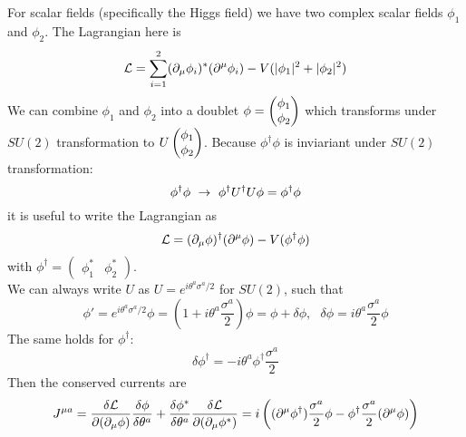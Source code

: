 For scalar fields (specifically the Higgs field) we have two complex scalar fields $\phi_1$ and $\phi_2$. The Lagrangian here is
\[ \mathcal{L} = \sum_{i = 1}^2 ( \partial _ \mu \phi_i)^*( \partial^\mu \phi_i) - V( | \phi_1|^2+ | \phi_2|^2)\]
We can combine $\phi_1$ and $\phi_2$ into a doublet $\phi = \begin{pmatrix} \phi_1 \\ \phi_2 \end{pmatrix}$ which transforms under $SU(2)$ transformation to $U \begin{pmatrix} \phi_1 \\ \phi_2 \end{pmatrix}$. Because $\phi^\dagger \phi$ is inviariant under $SU(2)$ transformation:
\[ \phi^\dagger \phi ~\rightarrow ~ \phi^\dagger U ^\dagger U \phi = \phi^\dagger \phi\]
it is useful to write the Lagrangian as
\[ \mathcal{L} = ( \partial_\mu \phi)^\dagger ( \partial^\mu \phi) - V( \phi^\dagger \phi)\]
with $ \phi^\dagger = \begin{pmatrix} \phi_1^* & \phi_2^*\end{pmatrix}$.\\
We can always write $U$ as $U = e^{i \theta^a \sigma^a/2}$ for $SU(2)$, such that 
\[ \phi' = e^{i \theta^a \sigma^a/2} \phi = \left( 1 + i \theta ^a \frac{\sigma^a}{2}\right) \phi = \phi + \delta \phi, ~~~\delta \phi = i \theta^a \frac{\sigma^a}{2} \phi\]
The same holds for $\phi^\dagger$:
\[ \delta \phi^\dagger = - i \theta^a \phi^\dagger \frac{\sigma^a}{2}\]
Then the conserved currents are
\[ J^{\mu a} = \frac{ \delta \mathcal{L}}{\partial ( \partial_\mu \phi)} \frac{\delta \phi}{\delta \theta^a} + \frac{\delta \phi^*}{\delta \theta^a} \frac{\delta \mathcal{L}}{\partial ( \partial_\mu \phi^*)} = i\left( ( \partial^\mu \phi^\dagger) \frac{\sigma^a}{2} \phi - \phi^\dagger \frac{\sigma^a}{2} ( \partial^\mu \phi) \right)  \]
